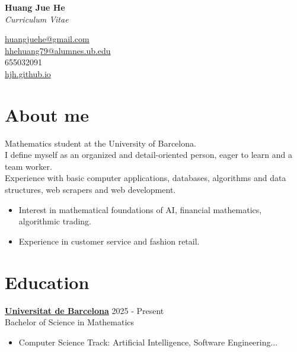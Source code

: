 \documentclass[11pt,a4paper]{article}
\newcommand{\link}[2]{\href{#1}{#2}}
\begin{document}
\sloppy

\noindent
\begin{minipage}[t]{0.5\textwidth}
    \Huge \textbf{Huang Jue He} \\[6pt]
    \large \textit{Curriculum Vitae}
\end{minipage}
\begin{minipage}[t]{0.5\textwidth}
    \raggedleft
    \link{mailto:huangjuehe@gmail.com}{huangjuehe@gmail.com} \\
    \link{mailto:hhehuang79@alumnes.ub.edu}{hhehuang79@alumnes.ub.edu} \\
    655032091\\
    \link{https://hjh.github.io/}{hjh.github.io} \\
\end{minipage}

\section*{About me}
Mathematics student at the University of Barcelona.\\
I define myself as an organized and detail-oriented person, eager to learn and a team worker.\\
Experience with basic computer applications, databases, algorithms and data structures, web scrapers and web development.
\begin{itemize}[label=-]
    \item Interest in mathematical foundations of AI, financial mathematics, algorithmic trading.
    \item Experience in customer service and fashion retail.
\end{itemize}

\section*{Education}

\href{https://mat.ub.edu/graumatematiques/}{\textbf{Universitat de Barcelona}} \hfill 2025 - Present \\ 
Bachelor of Science in Mathematics
\begin{itemize}[label=-]
    \item Computer Science Track: Artificial Intelligence, Software Engineering...
\end{itemize}
\end{document}
